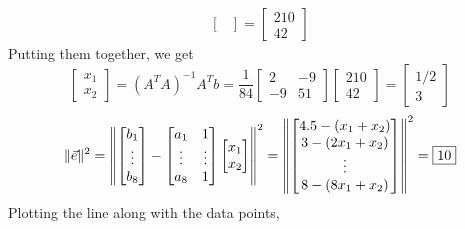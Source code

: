 \documentclass[letter]{article}
\newenvironment{menumerate}{\edef\backupindent{\the\parindent}
  \enumerate\setlength{\parindent}{\backupindent}}
  {\endenumerate}
\begin{document}
\begin{menumerate}
\begin{menumerate}
\begin{equation*}
\begin{aligned}
\begin{bmatrix}
            \end{bmatrix}
            = \begin{bmatrix}
                210\\42
            \end{bmatrix}
        \end{aligned}
        \end{equation*}
        Putting them together, we get
        \begin{equation*}
            \begin{bmatrix}
                x_1\\x_2
            \end{bmatrix}
            = (A^TA)^{-1}A^Tb
            = \frac{1}{84}
            \begin{bmatrix}
                2&-9\\-9&51
            \end{bmatrix}
            \begin{bmatrix}
                210\\42
            \end{bmatrix}
            = \boxed{\begin{bmatrix}
                1/2\\3
            \end{bmatrix}}
        \end{equation*}
        \begin{equation*}
            \|\vec{e}\|^2 = \norm{\begin{bmatrix}
                b_1\\\vdots\\b_8
            \end{bmatrix} - \begin{bmatrix}
                a_1&1\\\vdots&\vdots\\a_8&1
            \end{bmatrix} \begin{bmatrix}
                x_1\\x_2
            \end{bmatrix}}^2 = \norm{\begin{bmatrix}
                4.5-(x_1 + x_2)\\3-(2x_1 + x_2)\\\vdots\\8-(8x_1 + x_2)
            \end{bmatrix}}^2 = \boxed{10}
        \end{equation*}
        Plotting the line along with the data points,

\end{menumerate}
\end{menumerate}
\end{document}
